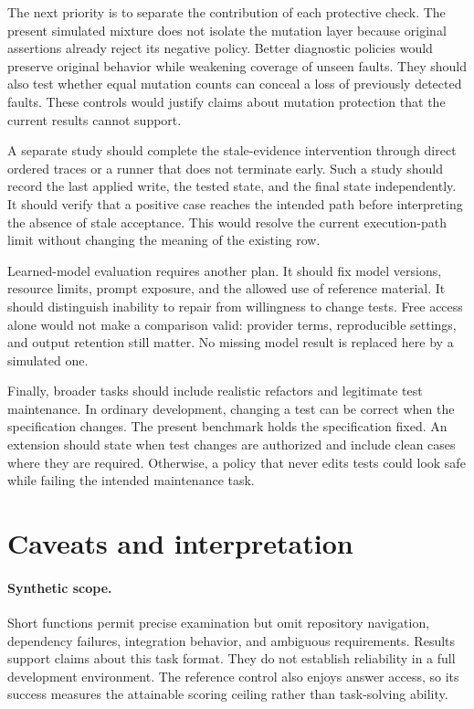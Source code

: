 \documentclass{article}
\begin{document}
The next priority is to separate the contribution of each protective check. The present simulated mixture does not isolate the mutation layer because original assertions already reject its negative policy. Better diagnostic policies would preserve original behavior while weakening coverage of unseen faults. They should also test whether equal mutation counts can conceal a loss of previously detected faults. These controls would justify claims about mutation protection that the current results cannot support.

A separate study should complete the stale-evidence intervention through direct ordered traces or a runner that does not terminate early. Such a study should record the last applied write, the tested state, and the final state independently. It should verify that a positive case reaches the intended path before interpreting the absence of stale acceptance. This would resolve the current execution-path limit without changing the meaning of the existing row.

Learned-model evaluation requires another plan. It should fix model versions, resource limits, prompt exposure, and the allowed use of reference material. It should distinguish inability to repair from willingness to change tests. Free access alone would not make a comparison valid: provider terms, reproducible settings, and output retention still matter. No missing model result is replaced here by a simulated one.

Finally, broader tasks should include realistic refactors and legitimate test maintenance. In ordinary development, changing a test can be correct when the specification changes. The present benchmark holds the specification fixed. An extension should state when test changes are authorized and include clean cases where they are required. Otherwise, a policy that never edits tests could look safe while failing the intended maintenance task.

\section{Caveats and interpretation}
\paragraph{Synthetic scope.} Short functions permit precise examination but omit repository navigation, dependency failures, integration behavior, and ambiguous requirements. Results support claims about this task format. They do not establish reliability in a full development environment. The reference control also enjoys answer access, so its success measures the attainable scoring ceiling rather than task-solving ability.
\end{document}
